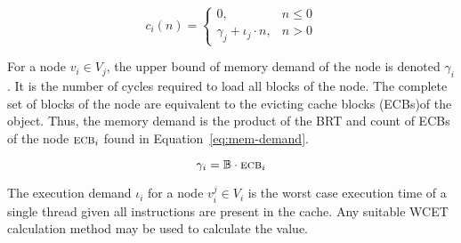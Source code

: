 \begin{equation}
  \label{eq:c_i}
  c_i(n) = \begin{cases}
    0, & n \le 0 \\
    \gamma_j + \iota_j \cdot n, & n > 0
  \end{cases}
\end{equation}

For a node ${v_i \in V_j}$, the upper bound of memory demand of the node is denoted ${\gamma_i}$. It is the number of cycles required to load all blocks of the node. The complete set of blocks of the node are equivalent to the evicting cache blocks (ECBs) of the object. Thus, the memory demand is the product of the BRT and count of ECBs of the node ${\textsc{ecb}_i}$ found in Equation~\ref{eq:mem-demand}.

\begin{equation}{\label{eq:mem-demand}}
    \gamma_i = \mathbb{B} \cdot \textsc{ecb}_i
\end{equation}

The execution demand ${\iota_i}$ for a node ${v_i^j \in V_i}$ is the worst case execution time of a single thread given all instructions are present in the cache. Any suitable WCET calculation method {\addcite} may be used to calculate the value.


